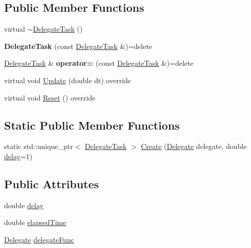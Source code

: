 \subsection*{Public Member Functions}
\begin{DoxyCompactItemize}
\item 
virtual \hyperlink{classastu_1_1DelegateTask_a948c5a93de18e5c9b6eafd247cdc849b}{$\sim$\+Delegate\+Task} ()
\item 
\mbox{\label{classastu_1_1DelegateTask_a28429114340e8b692f8cc32ef65a8199}} 
{\bfseries Delegate\+Task} (const \hyperlink{classastu_1_1DelegateTask}{Delegate\+Task} \&)=delete
\item 
\mbox{\label{classastu_1_1DelegateTask_ae0b4c2af0b5fd25270cc0e35784dc4ab}} 
\hyperlink{classastu_1_1DelegateTask}{Delegate\+Task} \& {\bfseries operator=} (const \hyperlink{classastu_1_1DelegateTask}{Delegate\+Task} \&)=delete
\item 
virtual void \hyperlink{classastu_1_1DelegateTask_a48755ab30194963c37e22ed118423704}{Update} (double dt) override
\item 
virtual void \hyperlink{classastu_1_1DelegateTask_a8bc7364937a4af2173e066174733e1d1}{Reset} () override
\end{DoxyCompactItemize}
\subsection*{Static Public Member Functions}
\begin{DoxyCompactItemize}
\item 
static std\+::unique\+\_\+ptr$<$ \hyperlink{classastu_1_1DelegateTask}{Delegate\+Task} $>$ \hyperlink{classastu_1_1DelegateTask_a3d27b0336f3f0ff70acef517312d9d37}{Create} (\hyperlink{classastu_1_1DelegateTask_a74c7859178eb0889e884209d1604de4d}{Delegate} delegate, double \hyperlink{classastu_1_1DelegateTask_a448096d7fea7f9a18490fbaa05616995}{delay}=1)
\end{DoxyCompactItemize}
\subsection*{Public Attributes}
\begin{DoxyCompactItemize}
\item 
double \hyperlink{classastu_1_1DelegateTask_a448096d7fea7f9a18490fbaa05616995}{delay}
\item 
double \hyperlink{classastu_1_1DelegateTask_ae192279cf06935c58ad19c28ac674e18}{elapsed\+Time}
\item 
\hyperlink{classastu_1_1DelegateTask_a74c7859178eb0889e884209d1604de4d}{Delegate} \hyperlink{classastu_1_1DelegateTask_a9dc938c77515b4be4501df66f8cb260c}{delegate\+Func}
\end{DoxyCompactItemize}
